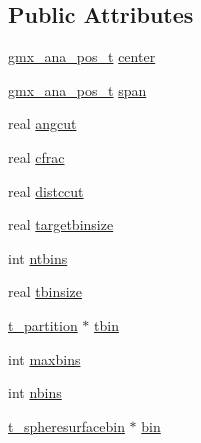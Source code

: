 \subsection*{\-Public \-Attributes}
\begin{DoxyCompactItemize}
\item 
\hyperlink{structgmx__ana__pos__t}{gmx\-\_\-ana\-\_\-pos\-\_\-t} \hyperlink{structt__methoddata__insolidangle_a6539e42606add2a09beb64be51c783eb}{center}
\item 
\hyperlink{structgmx__ana__pos__t}{gmx\-\_\-ana\-\_\-pos\-\_\-t} \hyperlink{structt__methoddata__insolidangle_aad5ce88f1a977f3fee8c77be3928c727}{span}
\item 
real \hyperlink{structt__methoddata__insolidangle_a3719abb1ecb6c567fe408df3df588c83}{angcut}
\item 
real \hyperlink{structt__methoddata__insolidangle_a6e8a60cab6402f9a075a5a1adb1a279d}{cfrac}
\item 
real \hyperlink{structt__methoddata__insolidangle_a234cd100cd11ba3d20e20d76ac5904ef}{distccut}
\item 
real \hyperlink{structt__methoddata__insolidangle_a83e7c021205702f30a5545f92c2f8519}{targetbinsize}
\item 
int \hyperlink{structt__methoddata__insolidangle_a1b6d5bed4a9c9a7d17b5956ee28b13e8}{ntbins}
\item 
real \hyperlink{structt__methoddata__insolidangle_aeac6f3e4dd5e3f04f8b4fbade5903d53}{tbinsize}
\item 
\hyperlink{structt__partition}{t\-\_\-partition} $\ast$ \hyperlink{structt__methoddata__insolidangle_aad06b800f5a20a33266d048954ad61f1}{tbin}
\item 
int \hyperlink{structt__methoddata__insolidangle_ab194fb34e21d1bdd0ec1a164b3b450fa}{maxbins}
\item 
int \hyperlink{structt__methoddata__insolidangle_ac44bee3216d6184122d8c0616c044c1d}{nbins}
\item 
\hyperlink{structt__spheresurfacebin}{t\-\_\-spheresurfacebin} $\ast$ \hyperlink{structt__methoddata__insolidangle_a45afb1e22a4c5ac2c79100657d6fffa2}{bin}
\end{DoxyCompactItemize}


